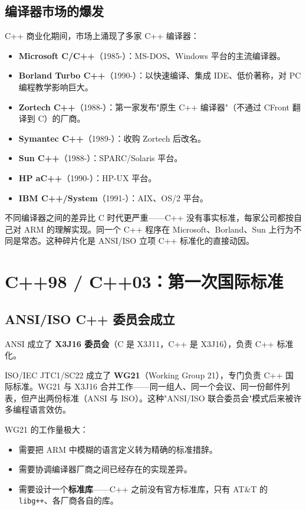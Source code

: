 \documentclass[12pt,a4paper,fontset=fandol]{ctexbook}
\newcommand{\yearlabel}[1]{%
  \tcbox[on line,colback=yearheadbg,colframe=yearheadbg,
    boxrule=0pt,arc=1pt,left=3pt,right=3pt,top=1pt,bottom=1pt,
    colupper=white,fontupper=\scriptsize\bfseries]{#1}}
\newcommand{\kw}[1]{\texttt{#1}}
\newcommand{\yrlbl}[1]{\yearlabel{#1}}
\begin{document}
\section{编译器市场的爆发}

\yrlbl{1985-1991} C++ 商业化期间，市场上涌现了多家 C++ 编译器：

\begin{itemize}
  \item \textbf{Microsoft C/C++}（1985-）：MS-DOS、Windows 平台的主流编译器。
  \item \textbf{Borland Turbo C++}（1990-）：以快速编译、集成 IDE、低价著称，对 PC 编程教学影响巨大。
  \item \textbf{Zortech C++}（1988-）：第一家发布"原生 C++ 编译器"（不通过 CFront 翻译到 C）的厂商。
  \item \textbf{Symantec C++}（1989-）：收购 Zortech 后改名。
  \item \textbf{Sun C++}（1988-）：SPARC/Solaris 平台。
  \item \textbf{HP aC++}（1990-）：HP-UX 平台。
  \item \textbf{IBM C++/System}（1991-）：AIX、OS/2 平台。
\end{itemize}

不同编译器之间的差异比 C 时代更严重——C++ 没有事实标准，每家公司都按自己对 ARM 的理解实现。同一个 C++ 程序在 Microsoft、Borland、Sun 上行为不同是常态。这种碎片化是 ANSI/ISO 立项 C++ 标准化的直接动因。

\chapter{C++98 / C++03：第一次国际标准}

\section{ANSI/ISO C++ 委员会成立}

\yrlbl{1991} ANSI 成立了 \textbf{X3J16 委员会}（C 是 X3J11，C++ 是 X3J16），负责 C++ 标准化。

\yrlbl{1993} ISO/IEC JTC1/SC22 成立了 \textbf{WG21}（Working Group 21），专门负责 C++ 国际标准。WG21 与 X3J16 合并工作——同一组人、同一个会议、同一份邮件列表，但产出两份标准（ANSI 与 ISO）。这种"ANSI/ISO 联合委员会"模式后来被许多编程语言效仿。

WG21 的工作量极大：

\begin{itemize}
  \item 需要把 ARM 中模糊的语言定义转为精确的标准措辞。
  \item 需要协调编译器厂商之间已经存在的实现差异。
  \item 需要设计一个\textbf{标准库}——C++ 之前没有官方标准库，只有 AT\&T 的 \kw{libg++}、各厂商各自的库。
\end{itemize}
\end{document}
